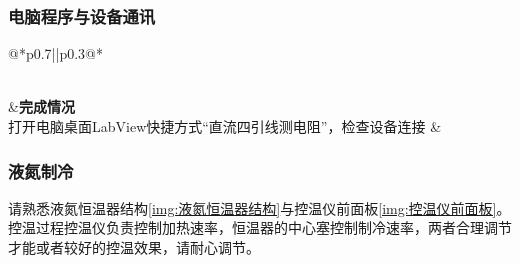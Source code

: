 \documentclass{spaexp}
\begin{document}
            \subsubsection{电脑程序与设备通讯}
                \begin{longtable}{@{*}p{}||p{}@{*}}
                    \caption{电脑程序与设备通讯操作步骤\label{tab:电脑程序与设备通讯}}\\
                    \hline\hline
                    &\textbf{完成情况}\\
                    \hline\hline
                    打开电脑桌面LabView快捷方式“直流四引线测电阻”，检查设备连接 & \\ \hline
                \end{longtable}

            \subsubsection{液氮制冷}
                请熟悉液氮恒温器结构\autoref{img:液氮恒温器结构}与控温仪前面板\autoref{img:控温仪前面板}。控温过程控温仪负责控制加热速率，恒温器的中心塞控制制冷速率，两者合理调节
                才能或者较好的控温效果，请耐心调节。
\end{document}
